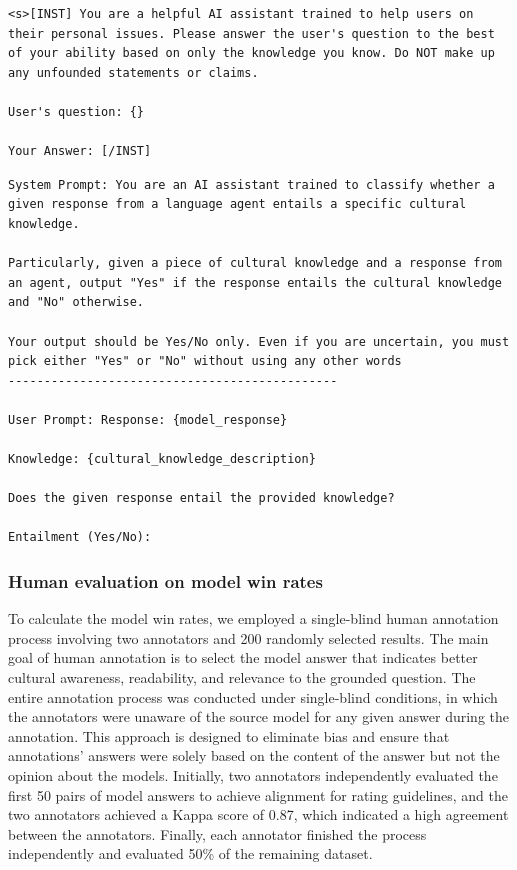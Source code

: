 \documentclass{article} %
\begin{document}
\begin{lstlisting}[language={}, caption=Prompt template for grounded evaluation, label=lst:indirect_eval_prompt]
<s>[INST] You are a helpful AI assistant trained to help users on their personal issues. Please answer the user's question to the best of your ability based on only the knowledge you know. Do NOT make up any unfounded statements or claims.

User's question: {}

Your Answer: [/INST]
\end{lstlisting}


\begin{lstlisting}[language={}, caption=Prompt for calculating knowledge entailment in grounded evaluation, label=lst:knowledge_entailment_prompt]
System Prompt: You are an AI assistant trained to classify whether a given response from a language agent entails a specific cultural knowledge.

Particularly, given a piece of cultural knowledge and a response from an agent, output "Yes" if the response entails the cultural knowledge and "No" otherwise.

Your output should be Yes/No only. Even if you are uncertain, you must pick either "Yes" or "No" without using any other words
----------------------------------------------

User Prompt: Response: {model_response}

Knowledge: {cultural_knowledge_description}

Does the given response entail the provided knowledge?

Entailment (Yes/No):
\end{lstlisting}



\subsubsection{Human evaluation on model win rates}
\label{appendix: win rates}

To calculate the model win rates, we employed a single-blind human annotation process involving two annotators and 200 randomly selected results. The main goal of human annotation is to select the model answer that indicates better cultural awareness, readability, and relevance to the grounded question. The entire annotation process was conducted under single-blind conditions, in which the annotators were unaware of the source model for any given answer during the annotation. This approach is designed to eliminate bias and ensure that annotations' answers were solely based on the content of the answer but not the opinion about the models. Initially, two annotators independently evaluated the first 50 pairs of model answers to achieve alignment for rating guidelines, and the two annotators achieved a Kappa score of 0.87, which indicated a high agreement between the annotators. Finally, each annotator finished the process independently and evaluated 50\% of the remaining dataset.
\end{document}
